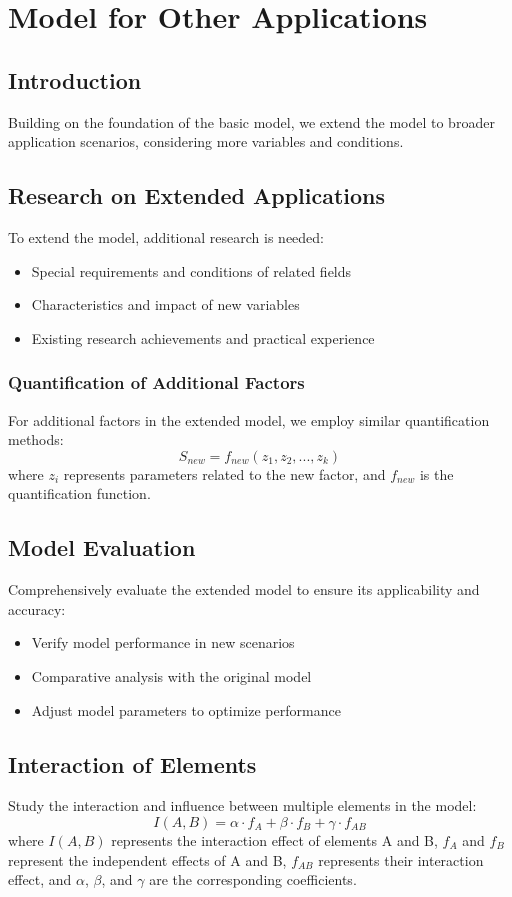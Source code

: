 \documentclass[12pt,a4paper]{article}
\begin{document}
\section{Model for Other Applications}
\subsection{Introduction}
Building on the foundation of the basic model, we extend the model to broader application scenarios, considering more variables and conditions.

\subsection{Research on Extended Applications}
To extend the model, additional research is needed:
\begin{itemize}
  \item Special requirements and conditions of related fields
  \item Characteristics and impact of new variables
  \item Existing research achievements and practical experience
\end{itemize}

\subsubsection{Quantification of Additional Factors}
For additional factors in the extended model, we employ similar quantification methods:
\begin{equation}
S_{new} = f_{new}(z_1, z_2, ..., z_k)
\end{equation}
where $z_i$ represents parameters related to the new factor, and $f_{new}$ is the quantification function.

\subsection{Model Evaluation}
Comprehensively evaluate the extended model to ensure its applicability and accuracy:
\begin{itemize}
  \item Verify model performance in new scenarios
  \item Comparative analysis with the original model
  \item Adjust model parameters to optimize performance
\end{itemize}

\subsection{Interaction of Elements}
Study the interaction and influence between multiple elements in the model:
\begin{equation}
I(A, B) = \alpha \cdot f_A + \beta \cdot f_B + \gamma \cdot f_{AB}
\end{equation}
where $I(A, B)$ represents the interaction effect of elements A and B, $f_A$ and $f_B$ represent the independent effects of A and B, $f_{AB}$ represents their interaction effect, and $\alpha$, $\beta$, and $\gamma$ are the corresponding coefficients.
\end{document}
